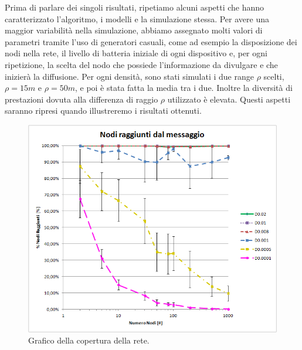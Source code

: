 Prima di parlare dei singoli risultati, ripetiamo alcuni aspetti che hanno caratterizzato l'algoritmo, i modelli e la simulazione stessa. Per avere una maggior variabilità nella simulazione, abbiamo assegnato molti valori di parametri tramite l'uso di generatori casuali, come ad esempio la disposizione dei nodi nella rete, il livello di batteria iniziale di ogni dispositivo e, per ogni ripetizione, la scelta del nodo che possiede l'informazione da divulgare e che inizierà la diffusione. Per ogni densità, sono stati simulati i due range $\rho$ scelti, $\rho=15m$ e $\rho=50m$, e poi è stata fatta la media tra i due. Inoltre la diversità di prestazioni dovuta alla differenza di raggio $\rho$ utilizzato è elevata. Questi aspetti saranno ripresi quando illustreremo i risultati ottenuti.

\begin{figure}[t]
	\centering
	\includegraphics[width=0.9\linewidth]{Images/risultati/copertura}
	\caption[Copertura]{Grafico della copertura della rete.}
	\label{fig:copertura}
\end{figure}
